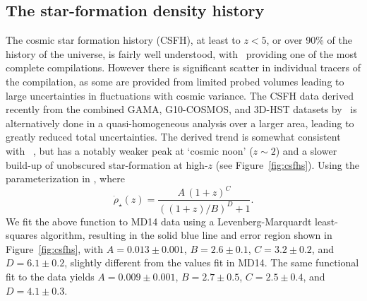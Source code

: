 \documentclass[apj]{aastex}
\begin{document}
\subsection{The star-formation density history}
The cosmic star formation history (CSFH), at least to $z < 5$, or over 90\% of the history of the universe, is fairly well understood, with~\cite{Madau:2014fk} providing one of the most complete compilations. However there is significant scatter in individual tracers of the compilation, as some are provided from limited probed volumes leading to large uncertainties in fluctuations with cosmic variance. The CSFH data derived recently from the combined GAMA, G10-COSMOS, and 3D-HST datasets by~\cite{Driver:2018nr} is alternatively done in a quasi-homogeneous analysis over a larger area, leading to greatly reduced total uncertainties. The derived trend is somewhat consistent with ~\cite{Madau:2014fk}, but has a notably weaker peak at `cosmic noon' ($z\sim2$) and a slower build-up of unobscured star-formation at high-$z$ (see Figure~\ref{fig:csfhs}).
Using the parameterization in \cite{Madau:2014fk}, where
\begin{equation}
\dot{\rho}_{\star}(z) = \frac{A\,(1+z)^C}{((1+z)/B)^D+1}.\label{eqn:mdp}
\end{equation}
\noindent We fit the above function to MD14 data using a Levenberg-Marquardt least-squares algorithm, resulting in the solid blue line and error region shown in Figure~\ref{fig:csfhs}, with $A=0.013\pm0.001$, $B=2.6\pm0.1$, $C=3.2\pm0.2$, and $D=6.1\pm0.2$, slightly different from the values fit in MD14. The same functional fit to the \cite{Driver:2018nr} data yields $A=0.009\pm0.001$, $B=2.7\pm0.5$, $C=2.5\pm0.4$, and $D=4.1\pm0.3$.
\end{document}
